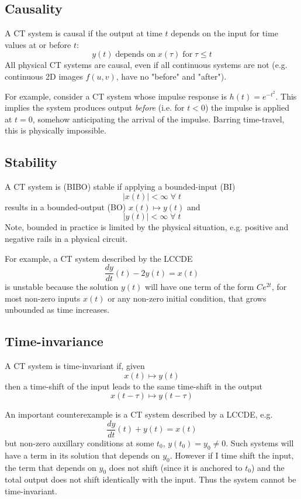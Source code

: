 \subsection{Causality}
A CT system is causal if the output at time $t$ depends on the input for time values at or before $t$:
\[
y(t) \;\text{depends on}\; x(\tau) \;\text{for} \; \tau \leq t
\]
All physical CT systems are causal, even if all continuous systems are not (e.g. continuous 2D images $f(u,v)$, have no "before" and "after").

For example, consider a CT system whose impulse response is $h(t) = e^{-t^2}$. This implies the system produces output \emph{before} (i.e. for $t < 0$) the impulse is applied at $t=0$, somehow anticipating the arrival of the impulse. Barring time-travel, this is physically impossible.

\subsection{Stability}

A CT system is (BIBO) stable if applying a bounded-input (BI)
\[
\left|x(t)\right| < \infty \; \forall \; t
\]
results in a bounded-output (BO) $x(t) \mapsto y(t)$ and 
\[
\left|y(t)\right| < \infty \; \forall \; t
\]
Note, bounded in practice is limited by the physical situation, e.g. positive and negative rails in a physical circuit.

For example, a CT system described by the LCCDE
\[
\frac{dy}{dt}(t) - 2y(t) = x(t)
\]
is unstable because the solution $y(t)$ will have one term of the form $Ce^{2t}$, for most non-zero inputs $x(t)$ or any non-zero initial condition, that grows unbounded as time increases.

\subsection{Time-invariance}
A CT system is time-invariant if, given
\[
x(t) \mapsto y(t)
\]
then a time-shift of the input leads to the same time-shift in the output
\[
x(t-\tau) \mapsto y(t-\tau)
\]

An important counterexample is a CT system described by a LCCDE, e.g.
\[
\frac{dy}{dt}(t) + y(t) = x(t)
\]
but non-zero auxillary conditions at some $t_0$, $y(t_0) = y_0 \neq 0$. Such systems will have a term in its solution that depends on $y_0$. However if I time shift the input, the term that depends on $y_0$ does not shift (since it is anchored to $t_0$) and the total output does not shift identically with the input. Thus the system cannot be time-invariant.

